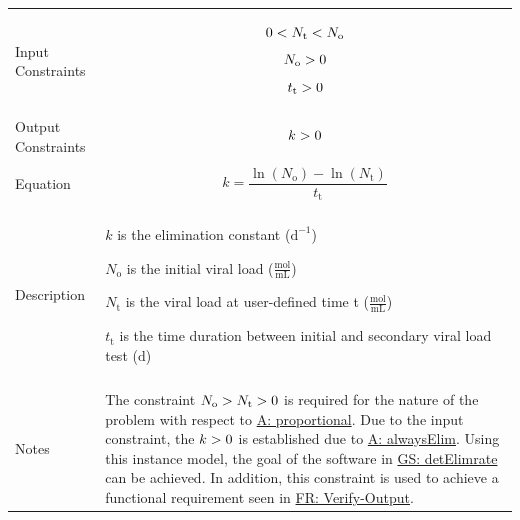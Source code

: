 \documentclass[12pt]{article}
\newcommand{\gt}{\ensuremath >}
\newcommand{\lt}{\ensuremath <}
\begin{document}
\begin{minipage}{\textwidth}
\begin{tabular}{>{\raggedright}p{}>{\raggedright\arraybackslash}p{}}
\\ \midrule \\
Input Constraints & \begin{displaymath}
                    0\lt{}{N_{\text{t}}}\lt{}{N_{\text{o}}}
                    \end{displaymath}
                    \begin{displaymath}
                    {N_{\text{o}}}\gt{}0
                    \end{displaymath}
                    \begin{displaymath}
                    {t_{\text{t}}}\gt{}0
                    \end{displaymath}
\\ \midrule \\
Output Constraints & \begin{displaymath}
                     k\gt{}0
                     \end{displaymath}
\\ \midrule \\
Equation & \begin{displaymath}
           k=\frac{\ln\left({N_{\text{o}}}\right)-\ln\left({N_{\text{t}}}\right)}{{t_{\text{t}}}}
           \end{displaymath}
\\ \midrule \\
Description & \begin{symbDescription}
              \item{$k$ is the elimination constant ($\text{d}^{-1}$)}
              \item{${N_{\text{o}}}$ is the initial viral load ($\frac{\text{mol}}{\text{mL}}$)}
              \item{${N_{\text{t}}}$ is the viral load at user-defined time t ($\frac{\text{mol}}{\text{mL}}$)}
              \item{${t_{\text{t}}}$ is the time duration between initial and secondary viral load test (${\text{d}}$)}
              \end{symbDescription}
\\ \midrule \\
Notes & The constraint ${N_{\text{o}}}\gt{}{N_{\text{t}}}\gt{}0$ is required for the nature of the problem with respect to \hyperref[proportional]{A: proportional}. Due to the input constraint,  the $k\gt{}0$ is established due to \hyperref[alwaysElim]{A: alwaysElim}. Using this instance model, the goal of the software in  \hyperref[detElimrate]{GS: detElimrate}  can be achieved. In addition, this constraint is used to achieve a functional requirement seen in  \hyperref[verifyOutput]{FR: Verify-Output}.
        

\end{tabular}
\end{minipage}
\end{document}
